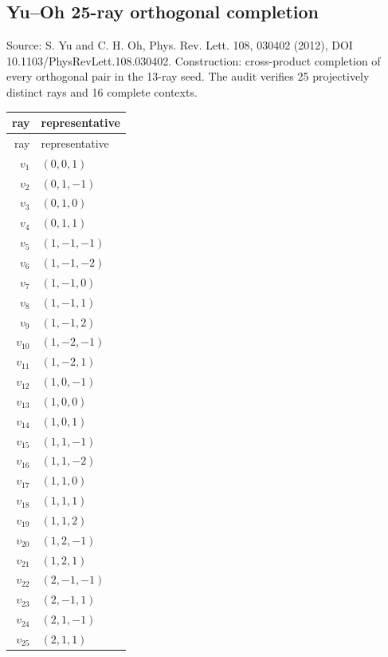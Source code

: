 \subsection{Yu--Oh 25-ray orthogonal completion}
\begingroup\sloppy Source: S. Yu and C. H. Oh, Phys. Rev. Lett. 108, 030402 (2012), DOI 10.1103/PhysRevLett.108.030402.  Construction: cross-product completion of every orthogonal pair in the 13-ray seed. The audit verifies 25 projectively distinct rays and 16 complete contexts.\par\endgroup
\begin{longtable}{@{}r l@{}}
\toprule
ray & representative\\
\midrule
\endfirsthead
\toprule
ray & representative\\
\midrule
\endhead
$v_{1}$ & $(0,0,1)$\\
$v_{2}$ & $(0,1,-1)$\\
$v_{3}$ & $(0,1,0)$\\
$v_{4}$ & $(0,1,1)$\\
$v_{5}$ & $(1,-1,-1)$\\
$v_{6}$ & $(1,-1,-2)$\\
$v_{7}$ & $(1,-1,0)$\\
$v_{8}$ & $(1,-1,1)$\\
$v_{9}$ & $(1,-1,2)$\\
$v_{10}$ & $(1,-2,-1)$\\
$v_{11}$ & $(1,-2,1)$\\
$v_{12}$ & $(1,0,-1)$\\
$v_{13}$ & $(1,0,0)$\\
$v_{14}$ & $(1,0,1)$\\
$v_{15}$ & $(1,1,-1)$\\
$v_{16}$ & $(1,1,-2)$\\
$v_{17}$ & $(1,1,0)$\\
$v_{18}$ & $(1,1,1)$\\
$v_{19}$ & $(1,1,2)$\\
$v_{20}$ & $(1,2,-1)$\\
$v_{21}$ & $(1,2,1)$\\
$v_{22}$ & $(2,-1,-1)$\\
$v_{23}$ & $(2,-1,1)$\\
$v_{24}$ & $(2,1,-1)$\\
$v_{25}$ & $(2,1,1)$\\
\bottomrule
\end{longtable}

